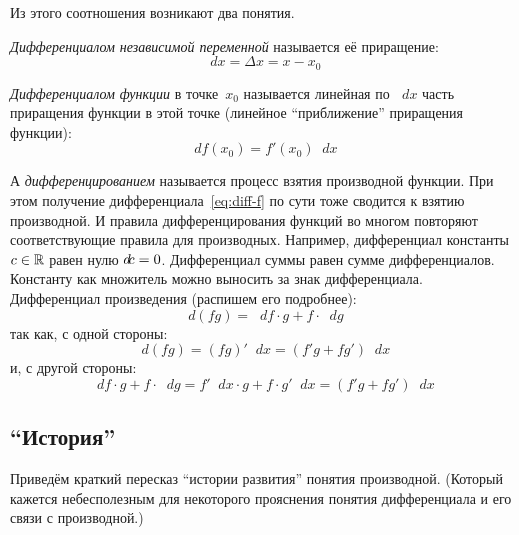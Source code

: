 \documentclass[a4paper,12pt]{article}
\newcommand{\diff}{\mathop{}\!d\!}
\begin{document}
  Из этого соотношения возникают два понятия.
  
  \emph{Дифференциалом независимой переменной} называется её приращение:
  \[
    \diff x = \Delta x = x - x_0
  \]

  \emph{Дифференциалом функции} в точке~$x_0$ называется линейная по $\diff x$ часть приращения функции в этой точке (линейное ``приближение'' приращения функции):
  \begin{equation}\label{eq:diff-f}
    \diff f(x_0) = f'(x_0) \diff x   %
  \end{equation}


  А \emph{дифференцированием} называется процесс взятия производной функции.
  При этом получение дифференциала~\eqref{eq:diff-f} по сути тоже сводится к взятию производной.
  И правила дифференцирования функций во многом повторяют соответствующие правила для производных.
  Например, дифференциал константы $c \hm\in \RR$ равен нулю $\diff c \hm= 0$.
  Дифференциал суммы равен сумме дифференциалов.
  Константу как множитель можно выносить за знак дифференциала.
  Дифференциал произведения (распишем его подробнее):
  \[
    \diff (fg) = \diff f \cdot g + f \cdot \diff g
  \]
  так как, с одной стороны:
  \[
    \diff (fg) = (fg)' \diff x = (f'g + fg') \diff x
  \]
  и, с другой стороны:
  \[
    \diff f \cdot g + f \cdot \diff g = f' \diff x \cdot g + f \cdot g' \diff x
      = (f' g + fg') \diff x
  \]
  

  \subsection{``История''}

  Приведём краткий пересказ ``истории развития'' понятия производной.
  (Который кажется небесполезным для некоторого прояснения понятия дифференциала и его связи с производной.)
  
\end{document}
